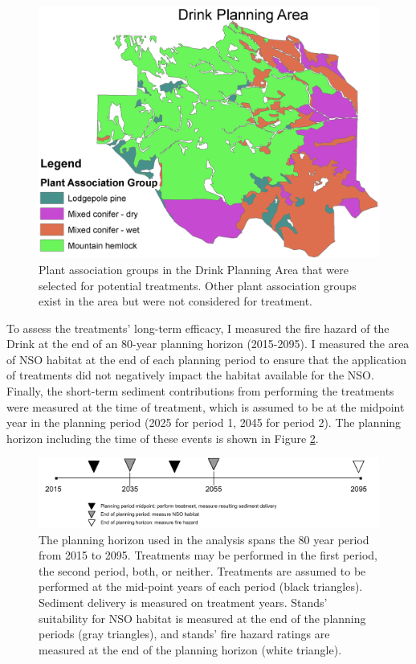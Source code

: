 \begin{figure}
\centering
\includegraphics[width=.5\textwidth]{../images/DrinkMap_PAGs}
\caption[Plant association groups in the Drink Planning Area]{Plant association groups in the Drink Planning Area that were selected for potential treatments. Other plant association groups exist in the area but were not considered for treatment.}
\label{fig:drinkPAGs}
\end{figure}

To assess the treatments' long-term efficacy, I measured the fire hazard of the Drink at the end of an 80-year planning horizon (2015-2095). I measured the area of NSO habitat at the end of each planning period to ensure that the application of treatments did not negatively impact the habitat available for the NSO. Finally, the short-term sediment contributions from performing the treatments were measured at the time of treatment, which is assumed to be at the midpoint year in the planning period (2025 for period 1, 2045 for period 2). The planning horizon including the time of these events is shown in Figure \ref{fig:drinkPlanningHorizon}.

\begin{figure}
\centering
\includegraphics[width=.85\textwidth]{../images/Drink_PlanningHorizon_Sketch}
\caption[Planning horizon schematic]{The planning horizon used in the analysis spans the 80 year period from 2015 to 2095. Treatments may be performed in the first period, the second period, both, or neither. Treatments are assumed to be performed at the mid-point years of each period (black triangles). Sediment delivery is measured on treatment years. Stands' suitability for NSO habitat is measured at the end of the planning periods (gray triangles), and stands' fire hazard ratings are measured at the end of the planning horizon (white triangle).}
\label{fig:drinkPlanningHorizon}
\end{figure}

